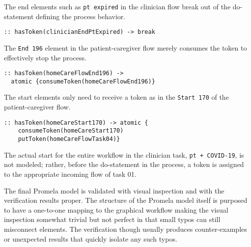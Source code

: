 The end elements such as \texttt{pt expired} in the clinician flow break out of the do-statement defining the process behavior.
%
{\small
\begin{lstlisting}[style=myPromela]
:: hasToken(clinicianEndPtExpired) -> break
\end{lstlisting}
}
%
\noindent The \texttt{End 196} element in the patient-caregiver flow merely consumes the token to effectively stop the process.
%
{\small
\begin{lstlisting}[style=myPromela]
:: hasToken(homeCareFlowEnd196) -> 
  atomic {consumeToken(homeCareFlowEnd196)}
\end{lstlisting}
}
% 
\noindent The start elements only need to receive a token as in the \texttt{Start 170} of the patient-caregiver flow.
%
{\small
\begin{lstlisting}[style=myPromela]
:: hasToken(homeCareStart170) -> atomic {
    consumeToken(homeCareStart170)
    putToken(homeCareFlowTask04)}
\end{lstlisting}
}
% 
\noindent The actual start for the entire workflow in the clinician task, \texttt{pt + COVID-19}, is not modeled; rather, before the do-statement in the process, a token is assigned to the appropriate incoming flow of task 01.

The final Promela model is validated with visual inspection and with the verification results proper. The structure of the Promela model itself is purposed to have a one-to-one mapping to the graphical workflow making the visual inspection somewhat trivial but not perfect in that small typos can still misconnect elements. The verification though usually produces counter-examples or unexpected results that quickly isolate any such typos.

\begin{comment}
Creating the actual Promela model is a tedious error-prone manual process. Some effort has been invested in naming, organizing, and formatting the model to make it more amenable to visual inspection. The visual inspection is the only process by which the structure of the flow in the Promela model is verified to match the structure of the flow in the BPMN graphical model.
\end{comment}
